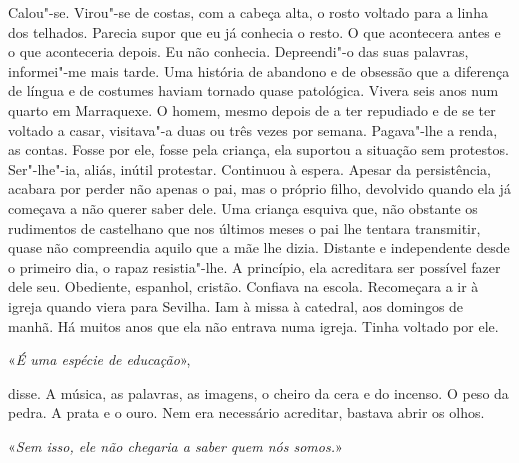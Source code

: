 Calou"-se. Virou"-se de costas, com a cabeça alta, o rosto voltado para
a linha dos telhados. Parecia supor que eu já conhecia o resto. O que
acontecera antes e o que aconteceria depois. Eu não conhecia.
Depreendi"-o das suas palavras, informei"-me mais tarde. Uma história de
abandono e de obsessão que a diferença de língua e de costumes haviam
tornado quase patológica. Vivera seis anos num quarto em Marraquexe. O
homem, mesmo depois de a ter repudiado e de se ter voltado a casar,
visitava"-a duas ou três vezes por semana. Pagava"-lhe a renda, as
contas. Fosse por ele, fosse pela criança, ela suportou a situação sem
protestos. Ser"-lhe"-ia, aliás, inútil protestar. Continuou à espera.
Apesar da persistência, acabara por perder não apenas o pai, mas o
próprio filho, devolvido quando ela já começava a não querer saber dele.
Uma criança esquiva que, não obstante os rudimentos de castelhano que
nos últimos meses o pai lhe tentara transmitir, quase não compreendia
aquilo que a mãe lhe dizia. Distante e independente desde o primeiro
dia, o rapaz resistia"-lhe. A princípio, ela acreditara ser possível
fazer dele seu. Obediente, espanhol, cristão. Confiava na escola.
Recomeçara a ir à igreja quando viera para Sevilha. Iam à missa à
catedral, aos domingos de manhã. Há muitos anos que ela não entrava numa
igreja. Tinha voltado por ele.

«\emph{É uma espécie de educação}»,

disse. A música, as palavras, as imagens, o cheiro da cera e do incenso.
O peso da pedra. A prata e o ouro. Nem era necessário acreditar, bastava
abrir os olhos.

«\emph{Sem isso, ele não chegaria a saber quem nós somos.}»


